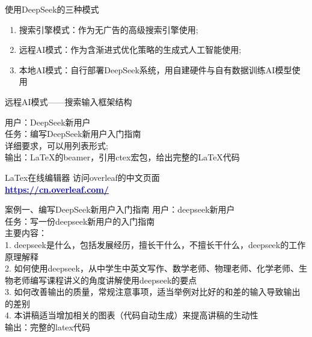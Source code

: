 \documentclass{ctexbeamer}
\begin{document}
\begin{frame}[t]{使用DeepSeek的三种模式}
\normalsize
\begin{spacing}{1.5}
\begin{enumerate}
  \item 搜索引擎模式：作为无广告的高级搜索引擎使用;
  \item 远程AI模式：作为含渐进式优化策略的生成式人工智能使用;
  \item 本地AI模式：自行部署DeepSeek系统，用自建硬件与自有数据训练AI模型使用
  \end{enumerate}
\end{spacing}
\end{frame}

\begin{frame}[t]{远程AI模式——搜索输入框架结构}
\normalsize
\begin{spacing}{1.5}
\alert{用户：DeepSeek新用户}\\
\alert{任务：编写DeepSeek新用户入门指南}\\
详细要求，可以用列表形式;\\
\alert{输出：LaTeX的beamer，引用ctex宏包，给出完整的LaTeX代码}
\end{spacing}
\end{frame}

\begin{frame}[t]{LaTex在线编辑器}
\vspace*{0.5cm}
\large{访问overleaf的中文页面 }\\
\vspace*{1.5cm}
\centering
\underline{\Huge \textbf{\href{https://cn.overleaf.com/}{\textcolor{blue}{https://cn.overleaf.com/}}}}

\end{frame}

\begin{frame}[t]{案例一、编写DeepSeek新用户入门指南}
\fontsize{10pt}{14pt}\selectfont
\alert{用户：deepseek新用户}\\
\alert{任务：写一份deepseek新用户的入门指南}\\
主要内容：\\
1. deepseek是什么，包括发展经历，擅长干什么，不擅长干什么，deepseek的工作原理解释\\
2. 如何使用deepseek，从中学生中英文写作、数学老师、物理老师、化学老师、生物老师编写课程讲义的角度讲解使用deepseek的要点\\
3. 如何改善输出的质量，常规注意事项，适当举例对比好的和差的输入导致输出的差别\\
4. 本讲稿适当增加相关的图表（代码自动生成）来提高讲稿的生动性\\
\alert{输出：完整的latex代码}
\end{frame}
\end{document}
